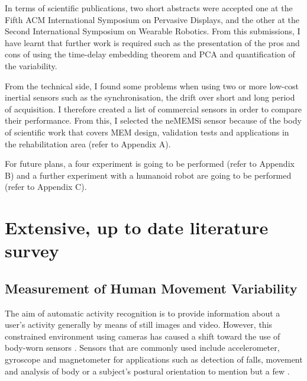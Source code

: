 \documentclass[9pt,journal,onecolumn,compsoc]{IEEEtran}
\begin{document}
In terms of scientific publications, two short abstracts were accepted one at
the Fifth ACM International Symposium on Pervasive Displays, and
the other at the Second International Symposium on Wearable Robotics.
From this submissions, I have learnt that further work is
required such as the presentation of the pros and cons of using the time-delay embedding theorem and PCA
and quantification of the variability.

From the technical side, I found some problems when using two or more
low-cost inertial sensors such as the synchronisation, the drift over short and long period of acquisition.
I therefore created a list of commercial sensors in order to compare their performance.
From this, I selected the neMEMSi sensor because of the body of scientific work that covers
MEM design, validation tests and applications in the rehabilitation area (refer to Appendix A).


For future plans, a four experiment is going to be performed (refer to Appendix B)
and a further experiment with a humanoid robot are going to be performed (refer to Appendix C).


\appendices

\section{Extensive, up to date literature survey}

\subsection{Measurement of Human Movement Variability}

The aim of automatic activity recognition is to provide information about a user's activity
generally by means of still images and video.
However, this constrained environment using cameras has caused a shift toward
the use of body-worn sensors \cite{bulling2014}. Sensors that are commonly used
include accelerometer, gyroscope and magnetometer for applications such as detection of falls,
movement and analysis of body or a subject's postural orientation to mention but a few \cite{Mukhopadhyay2014}.
\end{document}
